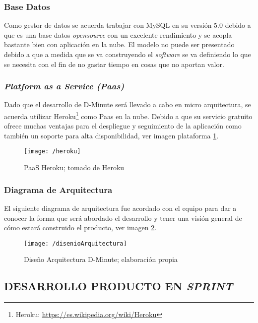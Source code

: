 \subsubsection{Base Datos}

Como gestor de datos se acuerda trabajar con MySQL en su versión 5.0 debido a que es una base datos \textit{opensource} con un excelente rendimiento y se acopla bastante bien con aplicación en la nube. 
El modelo no puede ser presentado debido a que a medida que se va construyendo el \textit{software} se va definiendo lo que se necesita con el fin de no gastar tiempo en cosas que no aportan valor.

\subsubsection{\textit{Platform as a Service (Paas)}}

Dado que el desarrollo de D-Minute será llevado a cabo en micro arquitectura, se acuerda utilizar Heroku\footnote{Heroku: \url{https://es.wikipedia.org/wiki/Heroku}} como Paas en la nube. Debido a que su servicio gratuito ofrece muchas ventajas para el despliegue y seguimiento de la aplicación como también un soporte para alta disponibilidad, ver imagen plataforma \ref{img4-14}.

\begin{figure}[!h]
\centering
\texttt{[image: /heroku]}
\caption{PaaS Heroku; tomado de Heroku} 
\label{img4-14}
\end{figure}

\subsubsection{Diagrama de Arquitectura}

El siguiente diagrama de arquitectura fue acordado con el equipo para dar a conocer la forma que será abordado el desarrollo y tener una visión general de cómo estará construido el producto, ver imagen \ref{img4-15}.

\begin{figure}[!h]
\centering
\texttt{[image: /disenioArquitectura]}
\caption{Dise\~no Arquitectura D-Minute; elaboración propia} 
\label{img4-15}
\end{figure}

\subsection{DESARROLLO PRODUCTO EN \textit{SPRINT}}

